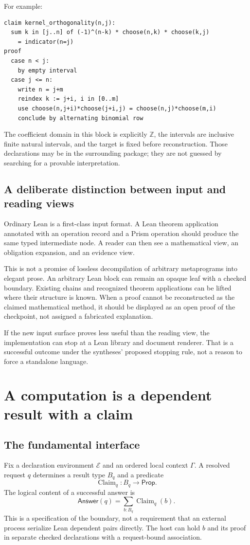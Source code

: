 \documentclass[11pt,a4paper]{article}
\newcommand{\code}[1]{\texttt{\detokenize{#1}}}
\newcommand{\Z}{\mathbb Z}
\newcommand{\Claim}{\operatorname{Claim}}
\newcommand{\E}{\mathcal E}
\newcommand{\G}{\Gamma}
\theoremstyle{definition}
\theoremstyle{remark}
\begin{document}
For example:
\begin{lstlisting}
claim kernel_orthogonality(n,j):
  sum k in [j..n] of (-1)^(n-k) * choose(n,k) * choose(k,j)
    = indicator(n=j)
proof
  case n < j:
    by empty interval
  case j <= n:
    write n = j+m
    reindex k := j+i, i in [0..m]
    use choose(n,j+i)*choose(j+i,j) = choose(n,j)*choose(m,i)
    conclude by alternating binomial row
\end{lstlisting}
The coefficient domain in this block is explicitly $\Z$, the intervals are inclusive finite natural intervals, and the target is fixed before reconstruction. Those declarations may be in the surrounding package; they are not guessed by searching for a provable interpretation.

\subsection{A deliberate distinction between input and reading views}
Ordinary Lean is a first-class input format. A Lean theorem application annotated with an operation record and a Prism operation should produce the same typed intermediate node. A reader can then see a mathematical view, an obligation expansion, and an evidence view.

This is not a promise of lossless decompilation of arbitrary metaprograms into elegant prose. An arbitrary Lean block can remain an opaque leaf with a checked boundary. Existing \code{have} chains and recognized theorem applications can be lifted where their structure is known. When a proof cannot be reconstructed as the claimed mathematical method, it should be displayed as an open proof of the checkpoint, not assigned a fabricated explanation.

If the new input surface proves less useful than the reading view, the implementation can stop at a Lean library and document renderer. That is a successful outcome under the syntheses' proposed stopping rule, not a reason to force a standalone language.

\section{A computation is a dependent result with a claim}\label{sec:result}
\subsection{The fundamental interface}
Fix a declaration environment $\E$ and an ordered local context $\G$. A resolved request $q$ determines a result type $B_q$ and a predicate
\[
\Claim_q:B_q\longrightarrow\mathsf{Prop}.
\]
The logical content of a successful answer is
\begin{equation}\label{eq:answer}
\mathsf{Answer}(q)=\sum_{b:B_q}\Claim_q(b).
\end{equation}
This is a specification of the boundary, not a requirement that an external process serialize Lean dependent pairs directly. The host can hold $b$ and its proof in separate checked declarations with a request-bound association.
\end{document}
